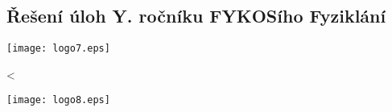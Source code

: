 \documentclass[fykos,\classoptions]{fksgeneric}
\begin{document}
\null
\vspace{0pt plus1fil}
\begin{center}
\section[Řešení úloh Y. ročníku FYKOSího Fyziklání]{\Huge Řešení úloh Y.
ročníku FYKOSího Fyziklání}
\vspace{10pt}
\texttt{[image: logo7.eps]}
\end{center}
\vspace{0pt plus2fil}

\newpage
    \setcounter{problem}{0}
    \ifnum\theproblem<\theproblemscount
    \repeat

\null
\vspace{0pt plus4fill}
\begin{center}
\texttt{[image: logo8.eps]}
\bigskip


\end{center}
\makefooter
\end{document}
